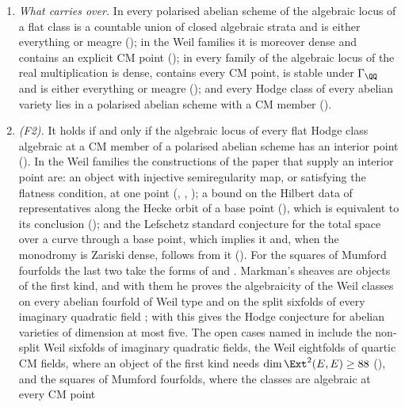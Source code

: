 \begin{theorem}\label{thm:twostand}
\leavevmode
\begin{enumerate}[label=\textup{(\roman*)},leftmargin=2.6em,itemsep=3pt]
\item \emph{What carries over.} In every polarised abelian scheme of
   the algebraic locus of a flat class is a
  countable union of closed algebraic strata and is either everything or
  meagre (); in the Weil families it is moreover dense
  and contains an explicit CM point (\cite[Theorem~1.1]{paperI}); in every family of
   the algebraic locus of the real multiplication is dense,
  contains every CM point, is stable under $\Gamma_{\QQ}$ and is either
  everything or meagre (); and every Hodge class of every
  abelian variety lies in a polarised abelian scheme with a CM member
  ().
\item \emph{(F2).} It holds if and only if the algebraic locus of every flat
  Hodge class algebraic at a CM member of a polarised abelian scheme has an
  interior point (). In the Weil families the
  constructions of the paper that supply an interior point are: an object
  with injective semiregularity map, or satisfying the flatness condition,
  at one point (, \cite[Theorem~17.7]{paperI},
  ); a bound on the Hilbert data of representatives along
  the Hecke orbit of a base point (\cite[Theorem~16.9]{paperI}), which is
  equivalent to its conclusion (\cite[Theorem~16.17]{paperI}); and the Lefschetz
  standard conjecture for the total space over a curve through a base point,
  which implies it and, when the monodromy is Zariski dense, follows from it
  (). For the squares of Mumford fourfolds the last two
  take the forms of  and .
  Markman's sheaves are objects of the first kind, and with them he proves
  the algebraicity of the Weil classes on every abelian fourfold of Weil
  type and on the split sixfolds of every imaginary quadratic field
  \cite{Mar25a,Mar25b}; with \cite{MZ99} this gives the Hodge conjecture for
  abelian varieties of dimension at most five. The open cases named in
   include the non-split Weil sixfolds of imaginary
  quadratic fields, the Weil eightfolds of quartic CM fields, where an
  object of the first kind needs
  $\dim\Ext^{2}(E,E)\ge88$ (), and the squares of
  Mumford fourfolds, where the classes are algebraic at every CM point

\end{enumerate}
\end{theorem}
